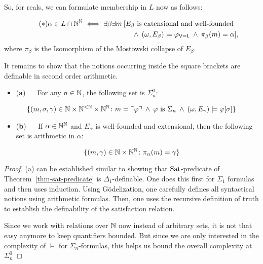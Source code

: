 So, for reals, we can formulate membership in $L$ now as follows:

\begin{align*} \tag{$*$}
	\alpha \in L \cap \mathbb{N}^{\mathbb{N}} \iff \exists \beta \exists m \: & [E_\beta \text{ is  extensional and well-founded} \\ & \quad \: \wedge \: (\omega,E_\beta) \models \varphi_{\mathsf{V=L}} \: \wedge \: \pi_\beta(m) = \alpha ],
\end{align*}
where $\pi_\beta$ is the Isomorphism of the Mostowski collapse of $E_\beta$.

It remains to show that the notions occurring inside the square brackets are definable in second order arithmetic.

\begin{proposition}\label{prop-satisfaction-arithmetic}\begin{itemize}
\item (\textbf{a}) $\quad$  For any $n \in \mathbb{N}$, the following set is $\Sigma^0_n$:
\end{itemize}
\begin{equation*}
\{(m,\sigma,\gamma) \in \mathbb{N}\times \mathbb{N}^{<\mathbb{N}}\times \mathbb{N}^{\mathbb{N}} \colon m = \ulcorner \varphi \urcorner \: \wedge \: \varphi \text{ is $\Sigma_n$} \: \wedge \: (\omega,E_\gamma) \models \varphi[\sigma] \}
\end{equation*}

\begin{itemize}
\item (\textbf{b}) $\quad$  If $\alpha \in \mathbb{N}^{\mathbb{N}}$ and $E_\alpha$ is well-founded and extensional, then the following set is arithmetic in $\alpha$:
\end{itemize}
\begin{equation*}
\{ (m,\gamma) \in \mathbb{N}\times \mathbb{N}^{\mathbb{N}} \colon \pi_\alpha(m) = \gamma\}
\end{equation*}
\end{proposition}\begin{proof}(a) can be established similar to showing that $\operatorname{Sat}$-predicate of Theorem~\ref{thm-sat-predicate} is $\Delta_1$-definable. One does this first for $\Sigma_1$ formulas and then uses induction. Using Gödelization, one carefully defines all syntactical notions using arithmetic formulas. Then, one uses the recursive definition of truth to establish the definability of the satisfaction relation.

Since we work with relations over $\mathbb{N}$ now instead of arbitrary sets, it is not that easy anymore to keep quantifiers bounded. But since we are only interested in the complexity of $\models$ for $\Sigma_n$-formulas, this helps us bound the overall complexity at $\Sigma^0_n$


\end{proof}
